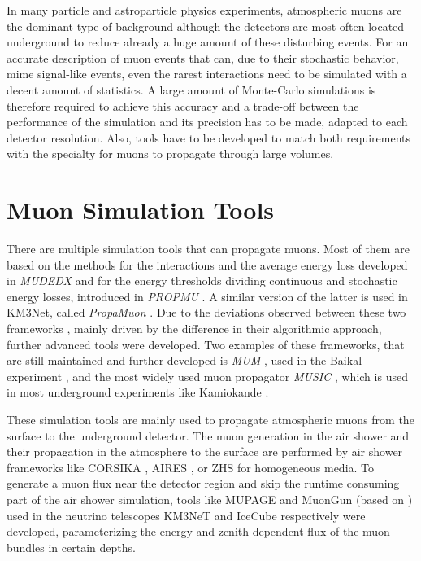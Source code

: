 In many particle and astroparticle physics experiments, atmospheric muons are the dominant type of background although the detectors are most often located underground to reduce already a huge amount of these disturbing events.
For an accurate description of muon events that can, due to their stochastic behavior, mime signal-like events, even the rarest interactions need to be simulated with a decent amount of statistics.
A large amount of Monte-Carlo simulations is therefore required to achieve this accuracy and a trade-off between the performance of the simulation and its precision has to be made, adapted to each detector resolution.
Also, tools have to be developed to match both requirements with the specialty for muons to propagate through large volumes.

%

\section{Muon Simulation Tools}

There are multiple simulation tools that can propagate muons.
Most of them are based on the methods for the interactions and the average energy loss developed in \textit{MUDEDX} \cite{Lohmann85} and for the energy thresholds dividing continuous and stochastic energy losses, introduced in \textit{PROPMU} \cite{Lipari91}.
A similar version of the latter is used in KM3Net, called \textit{PropaMuon} \cite{Km3Net2020gSeaGen}.
Due to the deviations observed between these two frameworks \cite{Desiati01ICRC}, mainly driven by the difference in their algorithmic approach, further advanced tools were developed.
Two examples of these frameworks, that are still maintained and further developed is \textit{MUM} \cite{Sokalski01MUM, Bugaev00MUM}, used in the Baikal experiment \cite{Baikal97}, and the most widely used muon propagator \textit{MUSIC} \cite{Antonioli97, Kudryavtseva99, Kudryavtsev09}, which is used in most underground experiments like Kamiokande \cite{HyperKamiokande18}.

These simulation tools are mainly used to propagate atmospheric muons from the surface to the underground detector.
The muon generation in the air shower and their propagation in the atmosphere to the surface are performed by air shower frameworks like CORSIKA \cite{CORSIKA, Engel19}, AIRES \cite{Sciutto19AIRES}, or ZHS \cite{Zas92ZHS} for homogeneous media.
To generate a muon flux near the detector region and skip the runtime consuming part of the air shower simulation, tools like MUPAGE \cite{Carminati09} and MuonGun (based on \cite{Becherini06}) used in the neutrino telescopes KM3NeT and IceCube respectively were developed, parameterizing the energy and zenith dependent flux of the muon bundles in certain depths.

